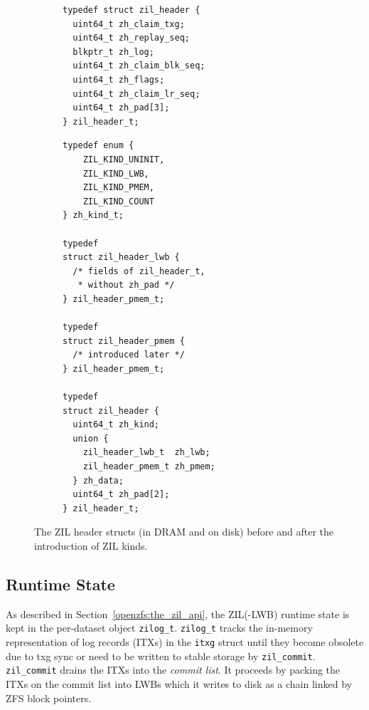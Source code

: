 \documentclass[12pt,a4paper,twoside]{book}
\begin{document}
\begin{figure}[h]
\begin{subfigure}[t]{0.45\textwidth}
\begin{lstlisting}
typedef struct zil_header {
  uint64_t zh_claim_txg;
  uint64_t zh_replay_seq;
  blkptr_t zh_log;
  uint64_t zh_claim_blk_seq;
  uint64_t zh_flags;
  uint64_t zh_claim_lr_seq;
  uint64_t zh_pad[3];
} zil_header_t;
\end{lstlisting}
\end{subfigure}
\hfill
\begin{subfigure}[t]{0.5\textwidth}
\begin{lstlisting}
typedef enum {
    ZIL_KIND_UNINIT,
    ZIL_KIND_LWB,
    ZIL_KIND_PMEM,
    ZIL_KIND_COUNT
} zh_kind_t;

typedef
struct zil_header_lwb {
  /* fields of zil_header_t,
   * without zh_pad */
} zil_header_pmem_t;

typedef
struct zil_header_pmem {
  /* introduced later */
} zil_header_pmem_t;

typedef
struct zil_header {
  uint64_t zh_kind;
  union {
    zil_header_lwb_t  zh_lwb;
    zil_header_pmem_t zh_pmem;
  } zh_data;
  uint64_t zh_pad[2];
} zil_header_t;
\end{lstlisting}
\end{subfigure}
\caption{The ZIL header structs (in DRAM and on disk) before and after the introduction of ZIL kinds.}
\label{lst:zil_header_before_and_after}
\end{figure}

\subsection{Runtime State}\label{sec:zil_kinds:runtime}
As described in Section~\ref{openzfs:the_zil_api}, the ZIL(-LWB) runtime state is kept in the per-dataset object \lstinline{zilog_t}.
\lstinline{zilog_t} tracks the in-memory representation of log records (ITXs) in the \lstinline{itxg} struct until they become obsolete due to txg sync or need to be written to stable storage by \lstinline{zil_commit}.
\lstinline{zil_commit} drains the ITXs into the \textit{commit list}.
It proceeds by packing the ITXs on the commit list into LWBs which it writes to disk as a chain linked by ZFS block pointers.
\end{document}
